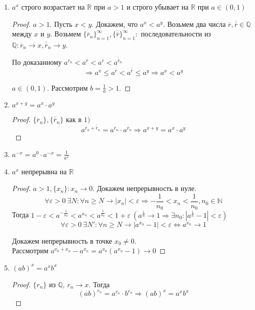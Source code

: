 \documentclass[12pt]{article}
\newenvironment{MyList}[1][4pt]{
  \begin{enumerate}[1.]
  \setlength{\parskip}{0pt}
  \setlength{\itemsep}{#1}
}{       
  \end{enumerate}
}
\def\Q{\mathbb{Q}}       %
\def\N{\mathbb{N}}       %
\def\R{\mathbb{R}}       %
\def\SO{\Rightarrow}     %
\def\EQ{\Leftrightarrow} %
\theoremstyle{definition} %
\theoremstyle{plain} %
\theoremstyle{remark} %
\begin{document}
\begin{MyList}
    \item $a^x$ строго возрастает на $\R$ при $a > 1$ и строго убывает на $\R$ при $a \in (0, 1)$
    \begin{proof}
        $a > 1$. Пусть $x < y$. Докажем, что $a^x < a^y$. Возьмем два числа $\overline{r}, \overline{\overline{r}} \in \Q$ между $x$ и $y$.
        Возьмем $\{\overline{r}_n\}_{n = 1}^\infty, \{\overline{\overline{r}}\}_{n = 1}^\infty :$ последовательности из $\Q : \overline{r}_n \to x, \overline{\overline{r}}_n \to y$.
        
        По доказанному $a^{\overline{r}_n} < a^{\overline{r}} < a^{\overline{\overline{r}}} < a^{\overline{\overline{r}}_n}$
        \[\SO a^x \leqslant a^{\overline{r}} < a^{\overline{\overline{r}}} \leqslant a^y \SO a^x < a^y\]
        
        $a \in (0, 1)$. Рассмотрим $b = \frac{1}{a} > 1$.  
    \end{proof}
    \item $a^{x + y} = a^x \cdot a^y$
    \begin{proof}
        $\{\overline{r}_n\}, \{\overline{\overline{r}}_n\}$ как в $1)$
        \[a^{\overline{r}_n + \overline{\overline{r}}_n} = a^{\overline{r}_n} \cdot a^{\overline{\overline{r}}_n} \SO a^{x + y} = a^x \cdot a^y\]
    \end{proof}
    \item $a^{-x} = a^0 \cdot a^{-x} = \frac{1}{a^x}$ 
    \item $a^x$ непрерывна на $\R$ 
    \begin{proof}
        $a > 1, \{x_n\}: x_n \to 0$. Докажем непрерывность в нуле.
        \[\forall \varepsilon > 0 \ \exists N : \forall n \geqslant N \to |x_n| < \varepsilon \SO -\frac{1}{n_0} < x_n < \frac{1}{n_0}, n_0 \in \N\]
        Тогда $1 - \varepsilon < a^{-\frac{1}{n_0}} < a^{x_n} < a^{\frac{1}{n_0}} < 1 + \varepsilon \ (a^{\frac{1}{n}} \to 1 \SO \exists n_0 : |a^{\frac{1}{n}} - 1| < \varepsilon)$
        \[\forall \varepsilon > 0 \ \exists N' : \forall n \geqslant N \to |a^{x_n} - 1| < \varepsilon \EQ a^{x_n} \to 1\]

        Докажем непрерывность в точке $x_0 \neq 0$. \\
        Рассмотрим $a^{x_0 + x_n} - a^{x_n} = a^{x_0} (a^{x_n} - 1) \to 0$  
    \end{proof}
    
    \item $(ab)^x = a^x b^x$
    \begin{proof}
        $\{r_n\}$ из $\Q$, $r_n \to x$. Тогда
        \[(ab)^{r_n} = a^{r_n} \cdot b^{r_n} \SO (ab)^x = a^x b^x\] 
    \end{proof}


\end{MyList}
\end{document}
